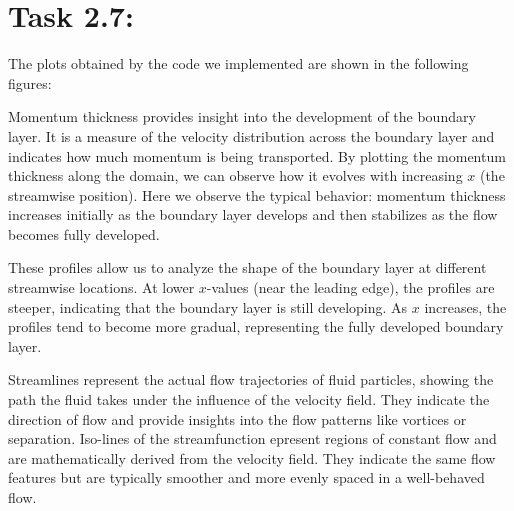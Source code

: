 \documentclass{article}
\begin{document}
\section*{\Large Task 2.7:}
The plots obtained by the code we implemented are shown in the following figures:
\begin{figure}[h]
\centering
{}
\hfill
{}
\label{fig:mieiduetrasparenti}
\end{figure}
Momentum thickness provides insight into the development of the boundary layer. It is a measure of the velocity distribution across the boundary layer and indicates how much momentum is being transported.
By plotting the momentum thickness along the domain, we can observe how it evolves with increasing $x$ (the streamwise position). Here we observe the typical behavior: momentum thickness increases initially as the boundary layer develops and then stabilizes as the flow becomes fully developed.

These profiles allow us to analyze the shape of the boundary layer at different streamwise locations. At lower $x$-values (near the leading edge), the profiles are steeper, indicating that the boundary layer is still developing.
As $x$ increases, the profiles tend to become more gradual, representing the fully developed boundary layer.

Streamlines represent the actual flow trajectories of fluid particles, showing the path the fluid takes under the influence of the velocity field. They indicate the direction of flow and provide insights into the flow patterns like vortices or separation.
Iso-lines of the streamfunction epresent regions of constant flow and are mathematically derived from the velocity field. They indicate the same flow features but are typically smoother and more evenly spaced in a well-behaved flow.
\end{document}
